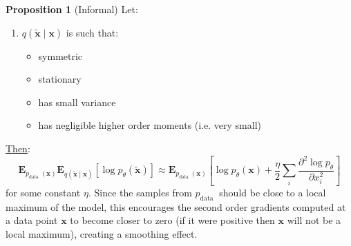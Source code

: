\documentclass[t]{beamer}  %
\begin{document}
\begin{frame}
\textbf{Proposition 1} (Informal) Let: 
\begin{enumerate}
    \item $q(\tilde{\bm{x}} \mid \bm{x})$  is such that:
    \begin{itemize}
        \item symmetric
        \item stationary
        \item has small variance
        \item has negligible higher order moments (i.e. very small)
    \end{itemize}
\end{enumerate}
\underline{Then}:
$$
\bm{E}_{p_{\text {data }}(\bm{x})} \bm{E}_{q(\tilde{\bm{x}} \mid \bm{x})}\left[\log p_{\theta}(\tilde{\bm{x}})\right] \approx \bm{E}_{p_{\text {data }}(\bm{x})}\left[\log p_{\theta}(\bm{x})+\frac{\eta}{2} \sum_{i} \frac{\partial^{2} \log p_{\theta}}{\partial x_{i}^{2}}\right]
$$
for some constant $\eta .$ 
\newline
\newline
Since the samples from $p_{\text {data }}$ should be close to a local maximum of the model, this encourages the second order gradients computed at a data point $\bm{x}$ to become closer to zero (if it were positive then $\bm{x}$ will not be a local maximum), creating a smoothing effect.
\end{frame}
\end{document}
